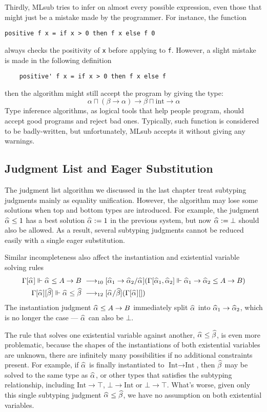 Thirdly, MLsub tries to infer on almost every possible expression,
even those that might just be a mistake made by the programmer.
For instance, the function
\begin{verbatim}
positive f x = if x > 0 then f x else f 0
\end{verbatim}
always checks the positivity of \verb|x| before applying to \verb|f|.
However, a slight mistake is made in the following definition
\begin{verbatim}
    positive' f x = if x > 0 then f x else f
\end{verbatim}
then the algorithm might still accept the program by giving the type:
$$\alpha \sqcap (\beta \to \alpha) \to \beta \sqcap \text{int} \to \alpha$$
Type inference algorithms, as logical tools that help people program,
should accept good programs and reject bad ones.
Typically, such function is considered to be badly-written,
but unfortunately, MLsub accepts it without giving any warnings.

\subsection{Judgment List and Eager Substitution}

The judgment list algorithm we discussed in the last chapter treat subtyping
judgments mainly as equality unification.
However, the algorithm may lose some solutions
when top and bottom types are introduced.
For example,
the judgment $\al \le 1$ has a best solution $\al := 1$ in the previous system,
but now $\al := \bot$ should also be allowed.
As a result, several subtyping judgments cannot be reduced easily with a single
eager substitution.

Similar incompleteness also affect the instantiation and existential variable solving rules
\begin{gather*}
\begin{aligned}
    \Gm[\al] \Vdash \al \le A\to B &\rrule{10} [\al[1]\to\al[2]/\al] (\Gm[\al[1], \al[2]] \Vdash \al[1]\to \al[2] \le A \to B)\\
    \Gm[\al][\bt] \Vdash \al \le \bt &\rrule{12} [\al/\bt](\Gm[\al][])
\end{aligned}
\end{gather*}
The instantiation judgment $\al \le A \to B$ immediately split $\al$ into $\al[1] \to \al[2]$,
which is no longer the case --- $\al$ can also be $\bot$.

The rule that solves one existential variable against another,
$\al \le \bt$, is even more problematic,
because the shapes of the instantiations of both existential variables are unknown,
there are infinitely many possibilities if no additional constraints present.
For example, if $\al$ is finally instantiated to $\text{Int} \to \text{Int}$,
then $\bt$ may be solved to the same type as $\al$,
or other types that satisfies the subtyping relationship,
including $\text{Int} \to \top$, $\bot \to \text{Int}$ or $\bot \to \top$.
What's worse, given only this single subtyping judgment $\al \le \bt$,
we have no assumption on both existential variables.


